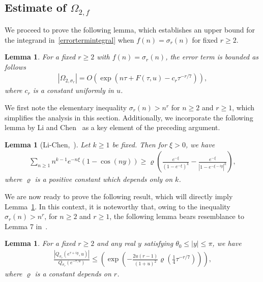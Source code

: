 \documentclass[12pt, oneside,reqno]{amsart}
\numberwithin{equation}{section}
\newtheorem{lemma}[theorem]{Lemma}
\begin{document}
\subsection{Estimate of $\Omega_{2,f}$}



We proceed to prove the following lemma, which establishes an upper bound for the integrand in~\eqref{errortermintegral} when $f(n)=\sigma_r(n)$ for fixed $r\geq 2$. 

\begin{lemma}\label{omega2sigmak}
For a fixed $r\geq 2$ with $f(n)=\sigma_r(n)$, the error term is bounded as follows
\begin{align*}
|\Omega_{2,\sigma_r}|
=O\left(\exp\left(n\tau+F(\tau,u)-c_{r}\tau^{-r/7}\right)\right),    
\end{align*} 
where $c_{r}$ is a constant uniformly in $u$.
\end{lemma}

We first note the elementary inequality $\sigma_r(n)>n^r$ for $n\geq 2$ and $r\geq 1$,  which simplifies the analysis in this section. Additionally, we incorporate the following lemma by Li and Chen~\cite[Lemma 2.5]{lichen} as a key element of the preceding argument. 

\begin{lemma}[Li-Chen,~\cite{lichen}]\label{lichenlemma}
Let $k\geq 1$ be fixed. Then for $\xi>0$, we have
\begin{align*}
\sum_{n\geq 1}n^{k-1}e^{-n\xi}(1-\cos(ny))\geq \varrho\left(\frac{e^{-\xi}}{(1-e^{-\xi})^{k}}-\frac{e^{-\xi}}{\left|1-e^{-\xi-iy}\right|^{k}}\right),   
\end{align*}
where $\varrho$ is a positive constant which depends only on $k$.
\end{lemma}

We are now ready to prove the following result, which will directly imply Lemma~\ref{omega2sigmak}. In this context, it is noteworthy that, owing to the inequality $\sigma_r(n)>n^r$, for $n\geq 2$ and $r\geq 1$, the following lemma bears resemblance to Lemma 7 in~\cite{lipniketal}. %

\begin{lemma}\label{qlemmaforomega2sigmak}
For a fixed $r\geq 2$ and any real $y$ satisfying $\theta_0\leq |y|\leq \pi$, we have
\begin{align*}
\frac{|Q_{\sigma_r}(e^{\tau+iy},u)|}{Q_{\sigma_r}(e^{-\tau,u})}
\leq\left(\exp\left(-\frac{2u(r-1)}{(1+u)^2}\varrho\left(\frac{1}{4}\tau^{-{r}/{7}}\right)\right)\right),
\end{align*}
where $\varrho$ is a constant depends on $r$.
\end{lemma}
\end{document}
